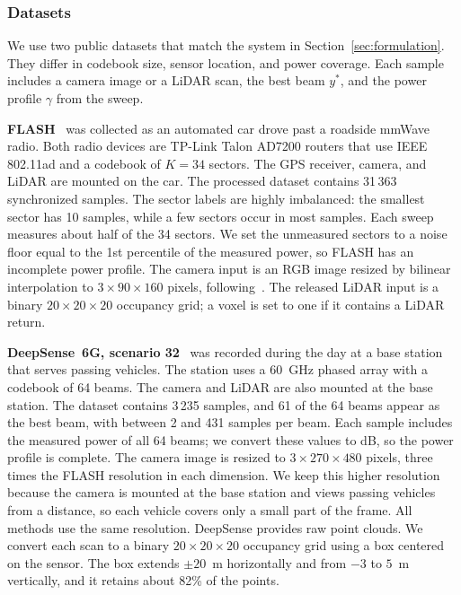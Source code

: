 \documentclass[journal,onecolumn]{IEEEtran}
\begin{document}
\subsubsection{Datasets}
We use two public datasets that match the system in Section~\ref{sec:formulation}. They differ in codebook size, sensor location, and power coverage. Each sample includes a camera image or a LiDAR scan, the best beam $y^{*}$, and the power profile $\gamma$ from the sweep.

\textbf{FLASH}~\cite{salehi2022flash} was collected as an automated car drove past a roadside mmWave radio. Both radio devices are TP-Link Talon AD7200 routers that use IEEE 802.11ad and a codebook of $K=34$ sectors. The GPS receiver, camera, and LiDAR are mounted on the car. The processed dataset contains 31\,363 synchronized samples. The sector labels are highly imbalanced: the smallest sector has 10 samples, while a few sectors occur in most samples. Each sweep measures about half of the 34 sectors. We set the unmeasured sectors to a noise floor equal to the 1st percentile of the measured power, so FLASH has an incomplete power profile. The camera input is an RGB image resized by bilinear interpolation to $3 \times 90 \times 160$ pixels, following~\cite{soltani2024learning}. The released LiDAR input is a binary $20 \times 20 \times 20$ occupancy grid; a voxel is set to one if it contains a LiDAR return.

\textbf{DeepSense~6G, scenario 32}~\cite{alkhateeb2023deepsense} was recorded during the day at a base station that serves passing vehicles. The station uses a 60~GHz phased array with a codebook of 64 beams. The camera and LiDAR are also mounted at the base station. The dataset contains 3\,235 samples, and 61 of the 64 beams appear as the best beam, with between 2 and 431 samples per beam. Each sample includes the measured power of all 64 beams; we convert these values to dB, so the power profile is complete. The camera image is resized to $3 \times 270 \times 480$ pixels, three times the FLASH resolution in each dimension. We keep this higher resolution because the camera is mounted at the base station and views passing vehicles from a distance, so each vehicle covers only a small part of the frame. All methods use the same resolution. DeepSense provides raw point clouds. We convert each scan to a binary $20 \times 20 \times 20$ occupancy grid using a box centered on the sensor. The box extends $\pm 20$~m horizontally and from $-3$ to $5$~m vertically, and it retains about 82\% of the points.
\end{document}

